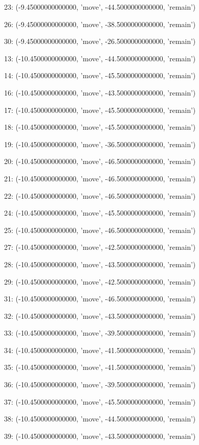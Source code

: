 23: (-9.45000000000000, 'move', -44.5000000000000, 'remain')


26: (-9.45000000000000, 'move', -38.5000000000000, 'remain')


30: (-9.45000000000000, 'move', -26.5000000000000, 'remain')


13: (-10.4500000000000, 'move', -44.5000000000000, 'remain')


14: (-10.4500000000000, 'move', -45.5000000000000, 'remain')


16: (-10.4500000000000, 'move', -43.5000000000000, 'remain')


17: (-10.4500000000000, 'move', -45.5000000000000, 'remain')


18: (-10.4500000000000, 'move', -45.5000000000000, 'remain')


19: (-10.4500000000000, 'move', -36.5000000000000, 'remain')


20: (-10.4500000000000, 'move', -46.5000000000000, 'remain')


21: (-10.4500000000000, 'move', -46.5000000000000, 'remain')


22: (-10.4500000000000, 'move', -46.5000000000000, 'remain')


24: (-10.4500000000000, 'move', -45.5000000000000, 'remain')


25: (-10.4500000000000, 'move', -46.5000000000000, 'remain')


27: (-10.4500000000000, 'move', -42.5000000000000, 'remain')


28: (-10.4500000000000, 'move', -43.5000000000000, 'remain')


29: (-10.4500000000000, 'move', -42.5000000000000, 'remain')


31: (-10.4500000000000, 'move', -46.5000000000000, 'remain')


32: (-10.4500000000000, 'move', -43.5000000000000, 'remain')


33: (-10.4500000000000, 'move', -39.5000000000000, 'remain')


34: (-10.4500000000000, 'move', -41.5000000000000, 'remain')


35: (-10.4500000000000, 'move', -41.5000000000000, 'remain')


36: (-10.4500000000000, 'move', -39.5000000000000, 'remain')


37: (-10.4500000000000, 'move', -45.5000000000000, 'remain')


38: (-10.4500000000000, 'move', -44.5000000000000, 'remain')


39: (-10.4500000000000, 'move', -43.5000000000000, 'remain')


